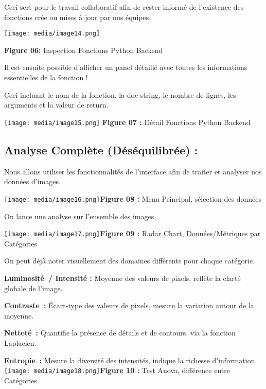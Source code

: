 Ceci sert pour le travail collaboratif afin de rester informé de
l'existence des fonctions crée ou mises à jour par nos équipes.

\texttt{[image: media/image14.png]}

\textbf{ Figure 06:} Inspection Fonctions Python Backend

Il est ensuite possible d'afficher un panel détaillé avec toutes les
informations essentielles de la fonction !

Ceci incluant le nom de la fonction, la doc string, le nombre de lignes,
les arguments et la valeur de return.

\texttt{[image: media/image15.png]}
\textbf{Figure 07 :} Détail Fonctions Python Backend

\subsection[Analyse Complète (Déséquilibrée)
:]{\texorpdfstring{\protect\hypertarget{anchor-36}{}{}\protect\hypertarget{anchor-37}{}{}\protect\hypertarget{anchor-38}{}{}Analyse
Complète (Déséquilibrée)
:}{Analyse Complète (Déséquilibrée) :}}\label{analyse-compluxe8te-duxe9suxe9quilibruxe9e}

Nous allons utiliser les fonctionnalités de l'interface afin de traiter
et analyser nos données d'images.

\texttt{[image: media/image16.png]}\textbf{Figure
08 :} Menu Principal, sélection des données

On lance une analyse sur l'ensemble des images.

\texttt{[image: media/image17.png]}\textbf{Figure
09 :} Radar Chart, Données/Métriques par Catégories

On peut déjà noter visuellement des domaines différents pour chaque
catégorie.

\textbf{Luminosité~/ Intensité :} Moyenne des valeurs de pixels, reflète
la clarté globale de l'image.

\textbf{Contraste~:} Écart-type des valeurs de pixels, mesure la
variation autour de la moyenne.

\textbf{Netteté~:} Quantifie la présence de détails et de contours, via
la fonction Laplacien.

\textbf{Entropie~:} Mesure la diversité des intensités, indique la
richesse
d'information.\texttt{[image: media/image18.png]}\textbf{Figure
10 :} Test Anova, différence entre Catégories

